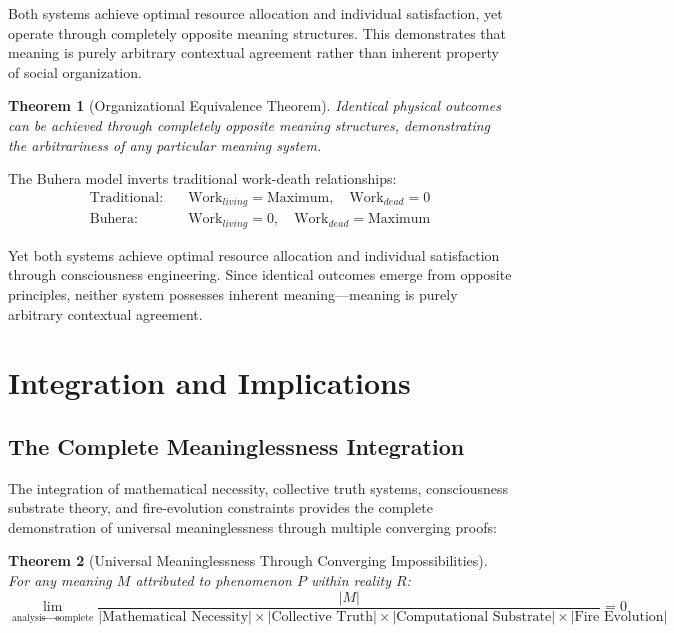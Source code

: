 \documentclass[12pt,a4paper]{article}
\newtheorem{theorem}{Theorem}[section]
\begin{document}
Both systems achieve optimal resource allocation and individual satisfaction, yet operate through completely opposite meaning structures. This demonstrates that meaning is purely arbitrary contextual agreement rather than inherent property of social organization.

\begin{theorem}[Organizational Equivalence Theorem]
Identical physical outcomes can be achieved through completely opposite meaning structures, demonstrating the arbitrariness of any particular meaning system.
\end{theorem}

The Buhera model inverts traditional work-death relationships:
\begin{align}
\text{Traditional:} \quad &\text{Work}_{living} = \text{Maximum}, \quad \text{Work}_{dead} = 0 \\
\text{Buhera:} \quad &\text{Work}_{living} = 0, \quad \text{Work}_{dead} = \text{Maximum}
\end{align}

Yet both systems achieve optimal resource allocation and individual satisfaction through consciousness engineering. Since identical outcomes emerge from opposite principles, neither system possesses inherent meaning—meaning is purely arbitrary contextual agreement.

\section{Integration and Implications}

\subsection{The Complete Meaninglessness Integration}

The integration of mathematical necessity, collective truth systems, consciousness substrate theory, and fire-evolution constraints provides the complete demonstration of universal meaninglessness through multiple converging proofs:

\begin{theorem}[Universal Meaninglessness Through Converging Impossibilities]
For any meaning $M$ attributed to phenomenon $P$ within reality $R$:
\begin{equation}
\lim_{\text{analysis} \to \text{complete}} \frac{|M|}{|\text{Mathematical Necessity}| \times |\text{Collective Truth}| \times |\text{Computational Substrate}| \times |\text{Fire Evolution}|} = 0
\end{equation}
\end{theorem}
\end{document}
